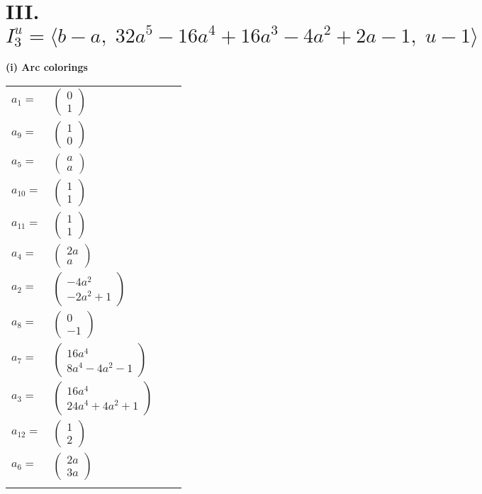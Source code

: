 \documentclass[1p]{elsarticle_modified}
\theoremstyle{definition}
\begin{document}
\centering \section*{III. $I^u_{3}= \langle b- a,\;32 a^5-16 a^4+16 a^3-4 a^2+2 a-1,\;u-1 \rangle$}
\flushleft \textbf{(i) Arc colorings}\\
\begin{tabular}{m{7pt} m{180pt} m{7pt} m{180pt} }
\flushright $a_{1}=$&$\begin{pmatrix}0\\1\end{pmatrix}$ \\
\flushright $a_{9}=$&$\begin{pmatrix}1\\0\end{pmatrix}$ \\
\flushright $a_{5}=$&$\begin{pmatrix}a\\a\end{pmatrix}$ \\
\flushright $a_{10}=$&$\begin{pmatrix}1\\1\end{pmatrix}$ \\
\flushright $a_{11}=$&$\begin{pmatrix}1\\1\end{pmatrix}$ \\
\flushright $a_{4}=$&$\begin{pmatrix}2 a\\a\end{pmatrix}$ \\
\flushright $a_{2}=$&$\begin{pmatrix}-4 a^2\\-2 a^2+1\end{pmatrix}$ \\
\flushright $a_{8}=$&$\begin{pmatrix}0\\-1\end{pmatrix}$ \\
\flushright $a_{7}=$&$\begin{pmatrix}16 a^4\\8 a^4-4 a^2-1\end{pmatrix}$ \\
\flushright $a_{3}=$&$\begin{pmatrix}16 a^4\\24 a^4+4 a^2+1\end{pmatrix}$ \\
\flushright $a_{12}=$&$\begin{pmatrix}1\\2\end{pmatrix}$ \\
\flushright $a_{6}=$&$\begin{pmatrix}2 a\\3 a\end{pmatrix}$\\&\end{tabular}
\end{document}
